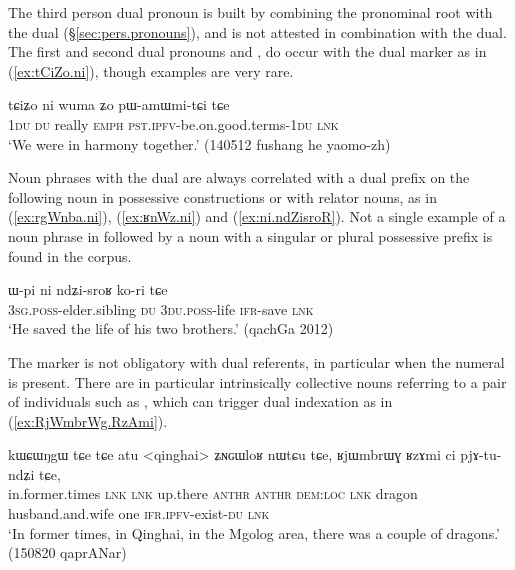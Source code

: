 The third person dual pronoun  is built by combining the pronominal root  with the dual  (§\ref{sec:pers.pronouns}), and is not attested in combination with the dual. The first and second dual pronouns  and , do occur with the dual marker as in (\ref{ex:tCiZo.ni}), though examples are very rare.

\begin{exe}
\ex \label{ex:tCiZo.ni}
\gll  tɕiʑo ni wuma ʑo pɯ-amɯmi-tɕi tɕe \\
\textsc{1du} \textsc{du} really \textsc{emph} \textsc{pst}.\textsc{ipfv}-be.on.good.terms-\textsc{1du} \textsc{lnk} \\
\glt `We were in harmony together.' (140512 fushang he yaomo-zh)
\end{exe}

Noun phrases with the dual  are always correlated with a dual prefix on the following noun in possessive constructions or with relator nouns, as in (\ref{ex:rgWnba.ni}), (\ref{ex:ʁnWz.ni}) and (\ref{ex:ni.ndZisroR}). Not a single example of a noun phrase in  followed by a noun with a singular or plural possessive prefix is found in the corpus.

\begin{exe}
\ex \label{ex:ni.ndZisroR} 
\gll ɯ-pi ni ndʑi-sroʁ ko-ri tɕe \\
\textsc{3sg}.\textsc{poss}-elder.sibling \textsc{du} \textsc{3du}.\textsc{poss}-life \textsc{ifr}-save \textsc{lnk} \\
\glt `He saved the life of his two brothers.' (qachGa 2012)
\end{exe}

The marker  is not obligatory with dual referents, in particular when the numeral  is present. 
There are in particular intrinsically collective nouns referring to a pair of individuals  such as , which can trigger dual indexation as in (\ref{ex:RjWmbrWg.RzAmi}).

\begin{exe}
\ex \label{ex:RjWmbrWg.RzAmi}
\gll  kɯɕɯŋgɯ tɕe tɕe atu <qinghai> ʑɴɢɯloʁ nɯtɕu tɕe, ʁjɯmbrɯɣ ʁzɤmi ci pjɤ-tu-ndʑi tɕe,  \\
in.former.times \textsc{lnk}  \textsc{lnk} up.there  \textsc{anthr} \textsc{anthr} \textsc{dem}:\textsc{loc} \textsc{lnk} dragon husband.and.wife one \textsc{ifr}.\textsc{ipfv}-exist-\textsc{du} \textsc{lnk} \\
\glt `In former times, in Qinghai, in the Mgolog area, there was a couple of dragons.' (150820 qaprANar)
\end{exe}

